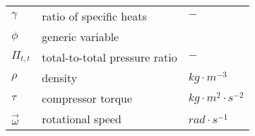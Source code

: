 \begin{tabular}{lll}
$\gamma$& ratio of specific heats & $-$ \\
$\phi$ & generic variable \\
$\varPi_{t,t}$ & total-to-total pressure ratio & $-$ \\
$\rho$ & density & $kg \cdot m^{-3}$ \\
$\tau$ & compressor torque & $kg\cdot m^{2}\cdot s^{-2}$ \\
$\vec \omega$ & rotational speed & $rad \cdot s^{-1}$ \\
\end{tabular}

\vspace{5mm}


